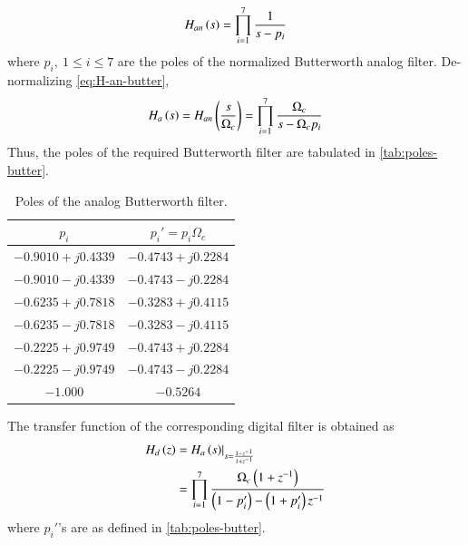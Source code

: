 \documentclass[journal,12pt,twocolumn]{IEEEtran}
\begin{document}
\begin{enumerate}[label=\theenumi.]
    \begin{equation}
        H_{an}\left(s\right) = \prod_{i=1}^7\frac{1}{s-p_i}
        \label{eq:H-an-butter}
    \end{equation}
    where \(p_i,\ 1 \le i \le 7\) are the poles of the normalized Butterworth
    analog filter. De-normalizing \eqref{eq:H-an-butter},
    \begin{equation}
        H_a\left(s\right) = H_{an}\left(\frac{s}{\Omega_c}\right) = \prod_{i=1}^7\frac{\Omega_c}{s-\Omega_cp_i}
        \label{eq:H-a-butter}
    \end{equation}
    Thus, the poles of the required Butterworth filter are tabulated in
    \autoref{tab:poles-butter}.
    \begin{table}[!ht]
        \centering
        \def\arraystretch{1.05}
        \begin{tabular}{|c|c|}
            \hline
            \(p_i\) & \(p_i' = p_i\Omega_c\) \\
            \hline
            \(-0.9010 + j0.4339\) & \(-0.4743 + j0.2284\) \\
            \hline
            \(-0.9010 - j0.4339\) & \(-0.4743 - j0.2284\) \\
            \hline
            \(-0.6235 + j0.7818\) & \(-0.3283 + j0.4115\) \\
            \hline
            \(-0.6235 - j0.7818\) & \(-0.3283 - j0.4115\) \\
            \hline
            \(-0.2225 + j0.9749\) & \(-0.4743 + j0.2284\) \\
            \hline
            \(-0.2225 - j0.9749\) & \(-0.4743 - j0.2284\) \\
            \hline
            \(-1.000\) & \(-0.5264\) \\
            \hline
        \end{tabular}
        \caption{Poles of the analog Butterworth filter.}
        \label{tab:poles-butter}
    \end{table}
    The transfer function of the corresponding digital filter is obtained as
    \begin{align}
        H_d\left(z\right) &= H_a\left(s\right)\rvert_{s = \frac{1-z^{-1}}{1+z^{-1}}} \\
        &= \prod_{i=1}^7\frac{\Omega_c\left(1+z^{-1}\right)}{\left(1-p_i'\right)-\left(1+p_i'\right)z^{-1}}
    \end{align}
    where \(p_i'\)'s are as defined in \autoref{tab:poles-butter}.
\end{enumerate}
\end{document}
